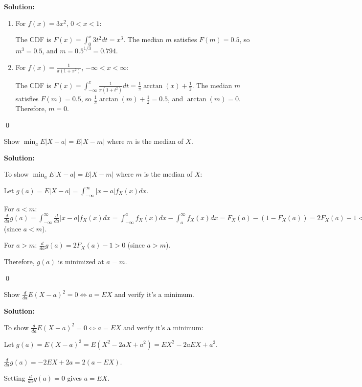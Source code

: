 \noindent\textbf{Solution:}
\begin{enumerate}[label=(\alph*)]
    \item For $f(x)=3x^2$, $0<x<1$:
    
    The CDF is $F(x) = \int_0^x 3t^2dt = x^3$.
    The median $m$ satisfies $F(m) = 0.5$, so $m^3 = 0.5$, and $m = 0.5^{1/3} = 0.794$.
    
    \item For $f(x)=\frac{1}{\pi(1+x^2)}$, $-\infty<x<\infty$:
    
    The CDF is $F(x) = \int_{-\infty}^x \frac{1}{\pi(1+t^2)}dt = \frac{1}{\pi}\arctan(x) + \frac{1}{2}$.
    The median $m$ satisfies $F(m) = 0.5$, so $\frac{1}{\pi}\arctan(m) + \frac{1}{2} = 0.5$, and $\arctan(m) = 0$.
    Therefore, $m = 0$.
\end{enumerate}


\qed
\begin{problembox}
Show $\min_a E|X-a| = E|X-m|$ where $m$ is the median of $X$.
\end{problembox}

\noindent\textbf{Solution:}

To show $\min_a E|X-a| = E|X-m|$ where $m$ is the median of $X$:

Let $g(a) = E|X-a| = \int_{-\infty}^{\infty} |x-a|f_X(x)dx$.

For $a < m$: $\frac{d}{da}g(a) = \int_{-\infty}^{\infty} \frac{d}{da}|x-a|f_X(x)dx = \int_{-\infty}^a f_X(x)dx - \int_a^{\infty} f_X(x)dx = F_X(a) - (1-F_X(a)) = 2F_X(a) - 1 < 0$ (since $a < m$).

For $a > m$: $\frac{d}{da}g(a) = 2F_X(a) - 1 > 0$ (since $a > m$).

Therefore, $g(a)$ is minimized at $a = m$.


\qed
\begin{problembox}
Show $\frac{d}{da}E(X-a)^2 = 0 \Leftrightarrow a=EX$ and verify it's a minimum.
\end{problembox}

\noindent\textbf{Solution:}

To show $\frac{d}{da}E(X-a)^2 = 0 \Leftrightarrow a=EX$ and verify it's a minimum:

Let $g(a) = E(X-a)^2 = E(X^2 - 2aX + a^2) = EX^2 - 2aEX + a^2$.

$\frac{d}{da}g(a) = -2EX + 2a = 2(a - EX)$.

Setting $\frac{d}{da}g(a) = 0$ gives $a = EX$.

